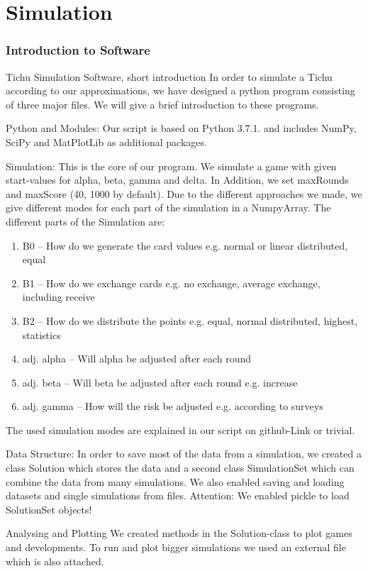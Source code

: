 \section{Simulation}
\subsubsection{Introduction to Software}
Tichu Simulation Software, short introduction
In order to simulate a Tichu according to our approximations, we have designed a python program consisting of three major files. We will give a brief introduction to these programs.

Python and Modules:
Our script is based on Python 3.7.1. and includes NumPy, SciPy and MatPlotLib as additional packages. 

Simulation:
This is the core of our program. We simulate a game with given start-values for alpha, beta, gamma and delta. In Addition, we set maxRounds and maxScore (40, 1000 by default). 
Due to the different approaches we made, we give different modes for each part of the simulation in a NumpyArray. The different parts of the Simulation are:
\begin{enumerate}
\item B0 – How do we generate the card values e.g. normal or linear distributed, equal
\item B1 – How do we exchange cards e.g. no exchange, average exchange, including receive
\item B2 – How do we distribute the points e.g. equal, normal distributed, highest, statistics
\item adj. alpha – Will alpha be adjusted after each round
\item adj. beta – Will beta be adjusted after each round e.g. increase
\item adj. gamma – How will the risk be adjusted e.g. according to surveys
\end{enumerate}
The used simulation modes are explained in our script on github-Link or trivial. 

Data Structure:
In order to save most of the data from a simulation, we created a class Solution which stores the data and a second class SimulationSet which can combine the data from many simulations. We also enabled saving and loading datasets and single simulations from files. Attention: We enabled pickle to load SolutionSet objects!  

Analysing and Plotting
We created methods in the Solution-class to plot games and developments. To run and plot bigger simulations we used an external file which is also attached. 


